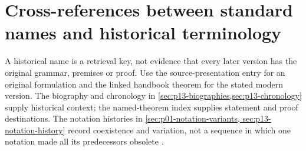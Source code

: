 \section{Cross-references between standard names and historical terminology}
\label{sec:p14-glossary-names}

A historical name is a retrieval key, not evidence that every later version
has the original grammar, premises or proof. Use the source-presentation
entry for an original formulation and the linked handbook theorem for the
stated modern version. The biography and chronology in
\cref{sec:p13-biographies,sec:p13-chronology} supply historical context;
the named-theorem index supplies statement and proof destinations.
The notation histories in \cref{sec:p01-notation-variants,
sec:p13-notation-history} record coexistence and variation, not a sequence
in which one notation made all its predecessors obsolete
\cite{WhiteheadRussell1910,Lukasiewicz1929,HilbertAckermann1928,
Gentzen1934a,Gentzen1935b}.

